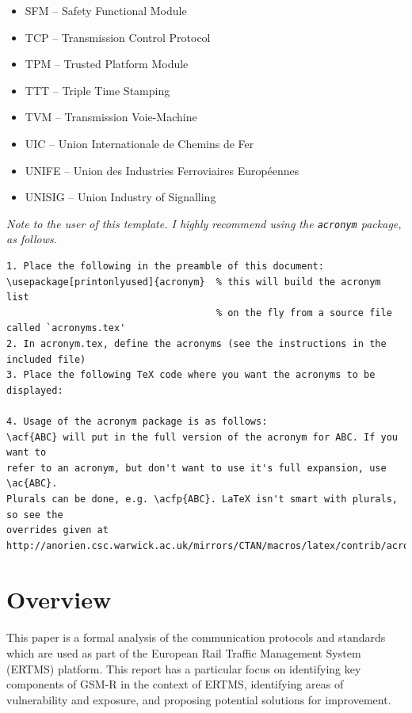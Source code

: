\documentclass[twoside,11pt,a4paper]{article}
\renewcommand{\headrulewidth}{0pt}
\newcommand{\minitab}{\hspace*{0.25em}}
\begin{document}
\begin{itemize}[nolistsep]
\item SFM -- Safety Functional Module
\item TCP -- Transmission Control Protocol
\item TPM -- Trusted Platform Module
\item TTT -- Triple Time Stamping
\item TVM -- Transmission Voie-Machine
\item UIC -- Union Internationale de Chemins de Fer
\item UNIFE -- Union des Industries Ferroviaires Europ\'eennes
\item UNISIG -- Union Industry of Signalling
\end{itemize}

\textit{Note to the user of this template. I highly recommend using the \texttt{acronym} package, as follows.}
\begin{verbatim}
1. Place the following in the preamble of this document:
\usepackage[printonlyused]{acronym}  % this will build the acronym list
                                     % on the fly from a source file called `acronyms.tex'
2. In acronym.tex, define the acronyms (see the instructions in the included file)
3. Place the following TeX code where you want the acronyms to be displayed:

4. Usage of the acronym package is as follows:
\acf{ABC} will put in the full version of the acronym for ABC. If you want to
refer to an acronym, but don't want to use it's full expansion, use \ac{ABC}.
Plurals can be done, e.g. \acfp{ABC}. LaTeX isn't smart with plurals, so see the
overrides given at 
http://anorien.csc.warwick.ac.uk/mirrors/CTAN/macros/latex/contrib/acronym/acronym.pdf

\end{verbatim}

\clearpage
\setcounter{page}{1}
\lhead{}\chead{MSc. Project Report :: \nouppercase{Section \thesection\minitab :: \leftmark}}\rhead{}
\renewcommand{\headrulewidth}{0.4pt}

\section{Overview}
This paper is a formal analysis of the communication protocols and standards which are used as part of the European Rail Traffic Management System (ERTMS) platform. This report has a particular focus on identifying key components of GSM-R in the context of ERTMS, identifying areas of vulnerability and exposure, and proposing potential solutions for improvement.
\end{document}
